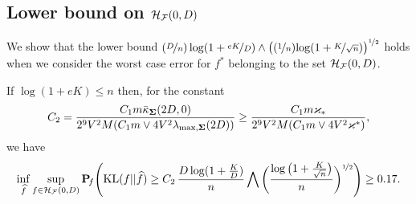 \subsection{Lower bound on $\mathcal H_\mathcal F(0,D)$} %

We show that the lower bound ${(\nicefrac{D}n)\log(1+\nicefrac{e K}D)}
\wedge\big((\nicefrac1n){\log(1+\nicefrac{K}{\sqrt{n}})}\big)^{\nicefrac12}$ holds 
when we consider the worst case  error for $f^*$ belonging to the set $\mathcal H_\mathcal F(0,D)$. 
\begin{proposition}
	\label{prop:lower:1}
	If $\log(1+eK)\le  n$ then, for the constant
	\begin{equation}
	C_2=\frac{C_1 m\bar\kappa_{\boldsymbol\Sigma}(2D,0)}{2^{9}V^2 M(C_1m\vee 4V^2\lambda_{\max,\boldsymbol\Sigma}(2D))}
	\ge \frac{C_1 m\varkappa_*}{2^{9}V^2 M(C_1m\vee 4V^2\varkappa^*)},
	\end{equation} 
	we have
	\begin{equation}
	\small
	\inf_{\widehat f}\sup_{f \in \mathcal H_\mathcal F(0,D)}\mathbf P\!_{f}\Bigg({\rm KL}(f||\widehat f)\geq
	C_2\,\frac{D\log(1+\frac{K}{D})}{n}\bigwedge\bigg(\frac{\log\big(1+\frac{K}{\sqrt{n}}\big)}{n}\bigg)^{\nicefrac12}\Bigg)
	\geq 0.17.
	\end{equation}
\end{proposition}

